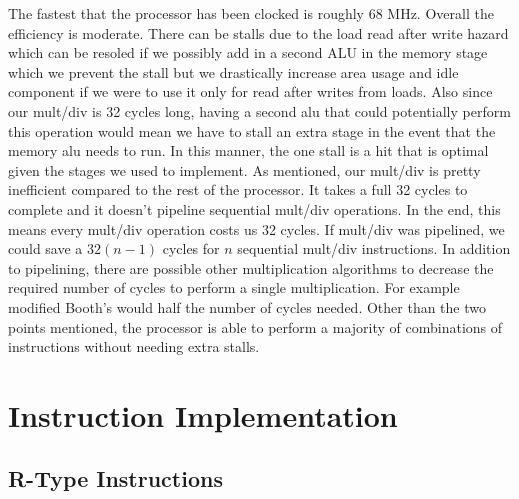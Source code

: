 \documentclass[letterpaper]{article} %
\begin{document}
The fastest that the processor has been clocked is roughly 68 MHz. Overall the efficiency is moderate. There can be stalls due to the load read after write hazard which can be resoled if we possibly add in a second ALU in the memory stage which we prevent the stall but we drastically increase area usage and idle component if we were to use it only for read after writes from loads. Also since our mult/div is 32 cycles long, having a second alu that could potentially perform this operation would mean we have to stall an extra stage in the event that the memory alu needs to run. In this manner, the one stall is a hit that is optimal given the stages we used to implement. As mentioned, our mult/div is pretty inefficient compared to the rest of the processor. It takes a full 32 cycles to complete and it doesn't pipeline sequential mult/div operations. In the end, this means every mult/div operation costs us 32 cycles. If mult/div was pipelined, we could save a $32(n-1)$ cycles for $n$ sequential mult/div instructions. In addition to pipelining, there are possible other multiplication algorithms to decrease the required number of cycles to perform a single multiplication. For example modified Booth's would half the number of cycles needed. Other than the two points mentioned, the processor is able to perform a majority of combinations of instructions without needing extra stalls.

\section*{Instruction Implementation}

\subsection*{R-Type Instructions}
\end{document}
